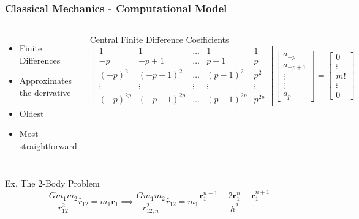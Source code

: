 \documentclass{beamer}
\begin{document}
\begin{frame}
    \frametitle{Classical Mechanics - Computational Model}

    \begin{columns}
            \begin{itemize}
                \item Finite Differences
                \item Approximates the derivative
                \item Oldest
                \item Most straightforward
            \end{itemize}
            \centering Central Finite Difference Coefficients
            \tiny \begin{equation}
                \begin{bmatrix}
                    1         & 1             & \ldots & 1            & 1 \\
                    -p        & -p + 1        & \ldots & p - 1        & p \\
                    (-p)^2    & (-p + 1)^2    & \ldots & (p - 1)^2    & p^2 \\
                    \vdots    & \vdots        & \vdots & \vdots       & \vdots \\
                    (-p)^{2p} & (-p + 1)^{2p} & \ldots & (p - 1)^{2p} & p^{2p} 
                \end{bmatrix}
                \begin{bmatrix}
                    a_{-p} \\
                    a_{-p + 1} \\
                    \vdots \\
                    \vdots \\
                    a_p
                \end{bmatrix} = 
                \begin{bmatrix}
                    0 \\
                    \vdots \\
                    m! \\
                    \vdots \\
                    0
                \end{bmatrix}
            \end{equation}
    \end{columns}
    \vfill
    \centering Ex. The 2-Body Problem
    \begin{equation}
        \frac{G m_1 m_2}{r_{12}^2} \hat{r}_{12} = m_1 \ddot{\mathbf{r}}_1 \implies \frac{G m_1 m_2}{r_{12, n}^2} \hat{r}_{12} = m_1 \frac{\mathbf{r}_1^{n-1} - 2 \mathbf{r}_1^n + \mathbf{r}_1^{n+1}}{h^2}
    \end{equation}
\end{frame}
\end{document}

